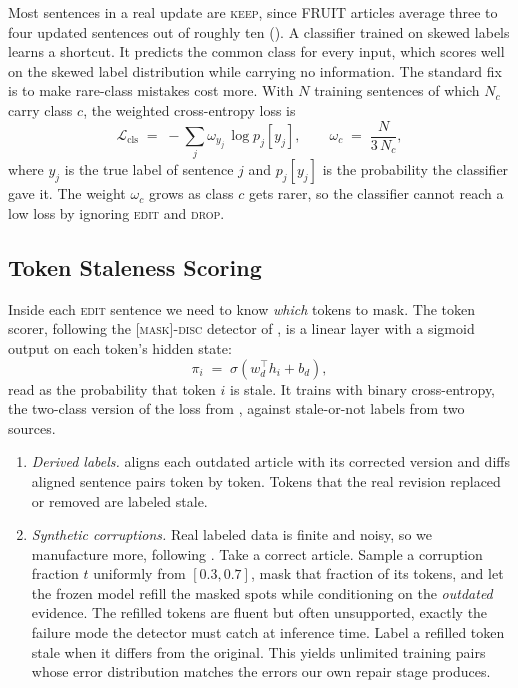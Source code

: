 \documentclass[]{paper}
\newcommand{\keep}{\textsc{keep}}
\newcommand{\edit}{\textsc{edit}}
\newcommand{\drop}{\textsc{drop}}
\newcommand{\maskdisc}{\textsc{[mask]-disc}}
\begin{document}
Most sentences in a real update are \keep{}, since FRUIT articles average three to four updated sentences out of roughly ten (). A classifier trained on skewed labels learns a shortcut. It predicts the common class for every input, which scores well on the skewed label distribution while carrying no information. The standard fix is to make rare-class mistakes cost more. With $N$ training sentences of which $N_c$ carry class $c$, the weighted cross-entropy loss is
\begin{equation}
\mathcal{L}_{\mathrm{cls}} \;=\;
-\sum_{j} \omega_{y_j}\, \log p_j[y_j],
\qquad
\omega_c \;=\; \frac{N}{3\, N_c},
\end{equation}
where $y_j$ is the true label of sentence $j$ and $p_j[y_j]$ is the probability the classifier gave it. The weight $\omega_c$ grows as class $c$ gets rarer, so the classifier cannot reach a low loss by ignoring \edit{} and \drop{}.

\subsection{Token Staleness Scoring}
\label{sec:tokenhead}

Inside each \edit{} sentence we need to know \emph{which} tokens to mask. The token scorer, following the \maskdisc{} detector of \citet{zou-etal-2026-detect}, is a linear layer with a sigmoid output on each token's hidden state:
\begin{equation}
\pi_i \;=\; \sigma\!\left(w_d^\top h_i + b_d\right),
\label{eq:token}
\end{equation}
read as the probability that token $i$ is stale. It trains with binary cross-entropy, the two-class version of the loss from , against stale-or-not labels from two sources.

\begin{enumerate}
\item \emph{Derived labels.}  aligns each outdated article with its corrected version and diffs aligned sentence pairs token by token. Tokens that the real revision replaced or removed are labeled stale.
\item \emph{Synthetic corruptions.} Real labeled data is finite and noisy, so we manufacture more, following \citet{zou-etal-2026-detect}. Take a correct article. Sample a corruption fraction $t$ uniformly from $[0.3, 0.7]$, mask that fraction of its tokens, and let the frozen model refill the masked spots while conditioning on the \emph{outdated} evidence. The refilled tokens are fluent but often unsupported, exactly the failure mode the detector must catch at inference time. Label a refilled token stale when it differs from the original. This yields unlimited training pairs whose error distribution matches the errors our own repair stage produces.
\end{enumerate}
\end{document}
